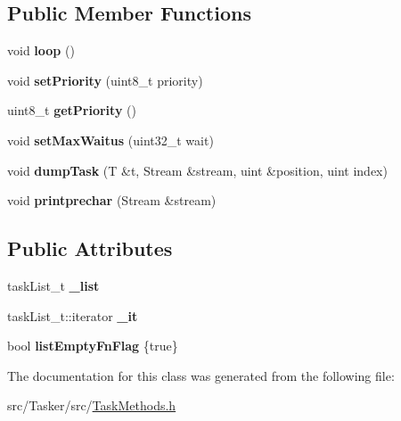 \subsection*{Public Member Functions}
\begin{DoxyCompactItemize}
\item 
\mbox{\label{class_a_sync_ad586983c3b5453864c12d37d5d6b7fad}} 
void {\bfseries loop} ()
\item 
\mbox{\label{class_a_sync_a6333015d654162322cfd09f13fe7ba44}} 
void {\bfseries set\+Priority} (uint8\+\_\+t priority)
\item 
\mbox{\label{class_a_sync_a5a427b4d80c9483aba739dfe11e85aef}} 
uint8\+\_\+t {\bfseries get\+Priority} ()
\item 
\mbox{\label{class_a_sync_a09aeb7ecadb4e7ec34c20565914ad112}} 
void {\bfseries set\+Max\+Waitus} (uint32\+\_\+t wait)
\item 
\mbox{\label{class_a_sync_a340dacc4205e0386ee5c5e38b0f789a4}} 
void {\bfseries dump\+Task} (T \&t, Stream \&stream, uint \&position, uint index)
\item 
\mbox{\label{class_a_sync_a00ce789e4369a80307d8f4b010fe3fc9}} 
void {\bfseries printprechar} (Stream \&stream)
\end{DoxyCompactItemize}
\subsection*{Public Attributes}
\begin{DoxyCompactItemize}
\item 
\mbox{\label{class_a_sync_ac5922c45fbedb75745fc665619d8ee32}} 
task\+List\+\_\+t {\bfseries \+\_\+list}
\item 
\mbox{\label{class_a_sync_a1e7f0ce9325ef0b094ca29cfec6a8e10}} 
task\+List\+\_\+t\+::iterator {\bfseries \+\_\+it}
\item 
\mbox{\label{class_a_sync_ac9ff530122c7aab4aa6906c5cfab1960}} 
bool {\bfseries list\+Empty\+Fn\+Flag} \{true\}
\end{DoxyCompactItemize}


The documentation for this class was generated from the following file\+:\begin{DoxyCompactItemize}
\item 
src/\+Tasker/src/\hyperlink{_task_methods_8h}{Task\+Methods.\+h}\end{DoxyCompactItemize}
